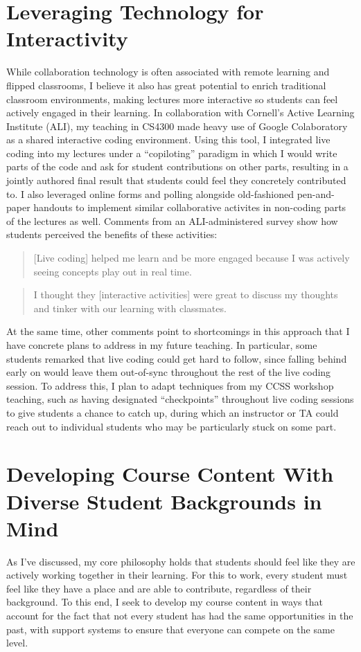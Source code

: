 \documentclass[12pt,letterpaper]{article}
\begin{document}
\section{Leveraging Technology for Interactivity}
While collaboration technology is often associated with remote learning and flipped classrooms, I believe it also has great potential to enrich traditional classroom environments, making lectures more interactive so students can feel actively engaged in their learning.
In collaboration with Cornell's Active Learning Institute (ALI), my teaching in CS4300 made heavy use of Google Colaboratory as a shared interactive coding environment.
Using this tool, I integrated live coding into my lectures under a ``copiloting'' paradigm in which I would write parts of the code and ask for student contributions on other parts, resulting in a jointly authored final result that students could feel they concretely contributed to.
I also leveraged online forms and polling alongside old-fashioned pen-and-paper handouts to implement similar collaborative activites in non-coding parts of the lectures as well.
Comments from an ALI-administered survey show how students perceived the benefits of these activities:

\begin{quote}
    [Live coding] helped me learn and be more engaged because I was actively seeing concepts play out in real time.
\end{quote}
\begin{quote}
    I thought they [interactive activities] were great to discuss my thoughts and tinker with our learning with classmates.
\end{quote}

At the same time, other comments point to shortcomings in this approach that I have concrete plans to address in my future teaching.
In particular, some students remarked that live coding could get hard to follow, since falling behind early on would leave them out-of-sync throughout the rest of the live coding session.
To address this, I plan to adapt techniques from my CCSS workshop teaching, such as having designated ``checkpoints'' throughout live coding sessions to give students a chance to catch up, during which an instructor
\ifliberalarts
%
\else
or TA
\fi
could reach out to individual students who may be particularly stuck on some part.
\interactionimprove

\section{Developing Course Content With Diverse Student Backgrounds in Mind}
As I've discussed, my core philosophy holds that students should feel like they are actively working together in their learning.
For this to work, every student must feel like they have a place and are able to contribute, regardless of their background.
To this end, I seek to develop my course content in ways that account for the fact that not every student has had the same opportunities in the past, with support systems to ensure that everyone can compete on the same level.
\end{document}
